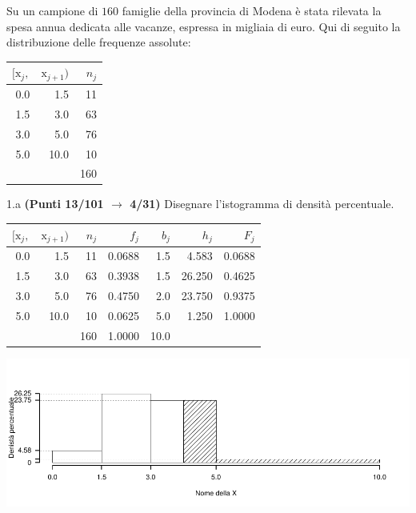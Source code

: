 \documentclass[
  11pt,
]{book}
\theoremstyle{mytheoremstyle}
\theoremstyle{mydefstyle}
\newenvironment{sol}
  {
  \begin{tcolorbox}[enhanced,breakable,arc=0.1mm,boxrule=1pt,colback=white,colframe=iblue,
  title=\bf \fontfamily{lmss}\selectfont \hspace{.5 cm} Soluzione,drop fuzzy shadow]

}{
\end{tcolorbox}
  }
\begin{document}
Su un campione di \(160\) famiglie della provincia di Modena è stata rilevata la spesa annua dedicata alle vacanze, espressa in migliaia di euro. Qui di seguito la distribuzione delle frequenze assolute:

\begin{table}[H]
\centering
\begin{tabular}{rrr}
\toprule
$[\text{x}_j,$ & $\text{x}_{j+1})$ & $n_j$\\
\midrule
0.0 & 1.5 & 11\\
1.5 & 3.0 & 63\\
3.0 & 5.0 & 76\\
5.0 & 10.0 & 10\\
 &  & 160\\
\bottomrule
\end{tabular}
\end{table}

1.a \textbf{(Punti 13/101 \(\rightarrow\) 4/31)} Disegnare l'istogramma di densità percentuale.

\begin{sol}

\begin{table}[H]
\centering
\begin{tabular}{rrrrrrr}
\toprule
$[\text{x}_j,$ & $\text{x}_{j+1})$ & $n_j$ & $f_j$ & $b_j$ & $h_j$ & $F_j$\\
\midrule
0.0 & 1.5 & 11 & 0.0688 & 1.5 & 4.583 & 0.0688\\
1.5 & 3.0 & 63 & 0.3938 & 1.5 & 26.250 & 0.4625\\
3.0 & 5.0 & 76 & 0.4750 & 2.0 & 23.750 & 0.9375\\
5.0 & 10.0 & 10 & 0.0625 & 5.0 & 1.250 & 1.0000\\
 &  & 160 & 1.0000 & 10.0 &  & \\
\bottomrule
\end{tabular}
\end{table}

\begin{center}\includegraphics{Esami_passati_con_soluzioni_files/figure-latex/2023-165-1} \end{center}

\end{sol}
\end{document}

